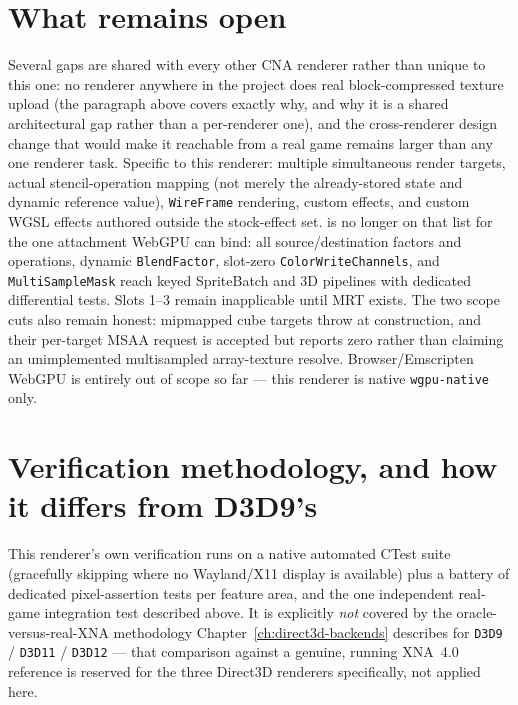 \section{What remains open}

Several gaps are shared with every other CNA renderer rather than unique to this one: no
renderer anywhere in the project does real block-compressed texture upload (the paragraph above
covers exactly why, and why it is a shared architectural gap rather than a per-renderer one),
and the cross-renderer design change that would make it reachable from a real game remains
larger than any one renderer task. Specific to this renderer: multiple simultaneous render
targets, actual stencil-operation mapping (not merely the already-stored state and dynamic
reference value), \texttt{WireFrame} rendering,
custom  effects, and custom WGSL effects authored outside the stock-effect
set.  is no longer on that list for the one attachment WebGPU can bind:
all source/destination factors and operations, dynamic \texttt{BlendFactor}, slot-zero
\texttt{ColorWriteChannels}, and \texttt{MultiSampleMask} reach keyed SpriteBatch and 3D
pipelines with dedicated differential tests. Slots 1--3 remain inapplicable until MRT exists.
The two  scope cuts also remain honest: mipmapped cube targets
throw at construction, and their per-target MSAA request is accepted but reports zero rather
than claiming an unimplemented multisampled array-texture resolve. Browser/Emscripten WebGPU is
entirely out of scope so far --- this renderer is native \texttt{wgpu-native} only.

\section{Verification methodology, and how it differs from D3D9's}

This renderer's own verification runs on a native automated CTest suite (gracefully skipping
where no Wayland/X11 display is available) plus a battery of dedicated pixel-assertion tests
per feature area, and the one independent real-game integration test described above. It is
explicitly \emph{not} covered by the oracle-versus-real-XNA methodology
Chapter~\ref{ch:direct3d-backends} describes for \texttt{D3D9} / \texttt{D3D11} / \texttt{D3D12}
--- that comparison against a genuine, running XNA~4.0 reference is reserved for the three
Direct3D renderers specifically, not applied here.

